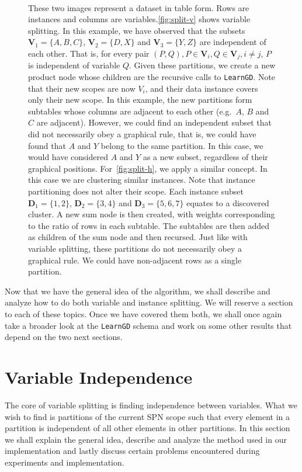 \documentclass{amsart}
\theoremstyle{plain}
\numberwithin{equation}{section}
\newcommand{\set}[1]{\mathbf{#1}}
\newcommand{\code}[1]{\lstinline[mathescape=true]{#1}}
\begin{document}
\begin{figure}[h]
\begin{subfigure}{0.49\linewidth}
    \caption{~}\label{fig:split-h}
  \end{subfigure}
  \captionsetup{singlelinecheck=false,justification=justified,margin=0cm}
  \caption{These two images represent a dataset in table form. Rows are instances and columns are
  variables.\autoref{fig:split-v} shows variable splitting. In this example, we have observed that
  the subsets $\set{V}_1=\{A,B,C\}$, $\set{V}_2=\{D,X\}$ and $\set{V}_3=\{Y,Z\}$ are independent of
  each other. That is, for every pair $(P,Q), P\in \set{V}_i, Q\in \set{V}_j, i\neq j$, $P$ is
  independent of variable $Q$.  Given these partitions, we create a new product node whose children
  are the recursive calls to \code{LearnGD}. Note that their new scopes are now $V_i$, and their
  data instance covers only their new scope. In this example, the new partitions form subtables
  whose columns are adjacent to each other (e.g.\ $A$, $B$ and $C$ are adjacent). However, we could
  find an independent subset that did not necessarily obey a graphical rule, that is, we could have
  found that $A$ and $Y$ belong to the same partition. In this case, we would have considered $A$
  and $Y$ as a new subset, regardless of their graphical positions. For~\autoref{fig:split-h}, we
  apply a similar concept.  In this case we are clustering similar instances. Note that instance
  partitioning does not alter their scope. Each instance subset $\set{D}_1=\{1,2\}$,
  $\set{D}_2=\{3,4\}$ and $\set{D}_3=\{5,6,7\}$ equates to a discovered cluster. A new sum node is
  then created, with weights corresponding to the ratio of rows in each subtable. The subtables are
  then added as children of the sum node and then recursed. Just like with variable splitting,
  these partitions do not necessarily obey a graphical rule. We could have non-adjacent rows as a
single partition.}\label{fig:splitting} \end{figure}

Now that we have the general idea of the algorithm, we shall describe and analyze how to do both
variable and instance splitting. We will reserve a section to each of these topics. Once we have
covered them both, we shall once again take a broader look at the \code{LearnGD} schema and work on
some other results that depend on the two next sections.

\section{Variable Independence}

The core of variable splitting is finding independence between variables. What we wish to find is
partitions of the current SPN scope such that every element in a partition is independent of all
other elements in other partitions. In this section we shall explain the general idea, describe and
analyze the method used in our implementation and lastly discuss certain problems encountered
during experiments and implementation.
\end{document}
